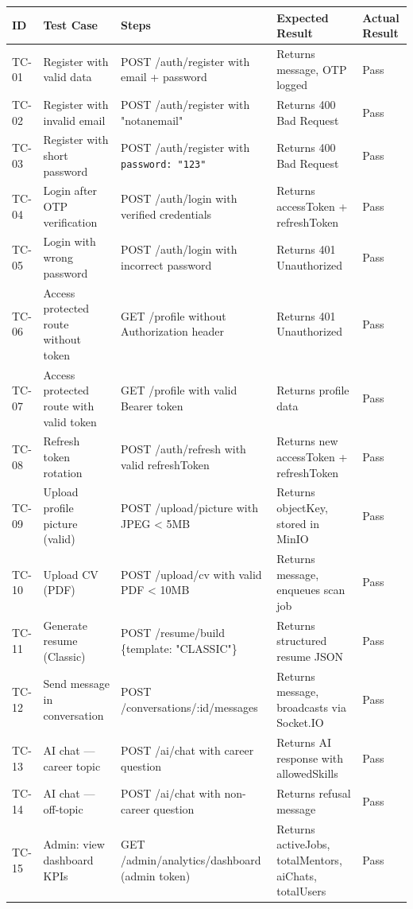 \documentclass[12pt,a4paper]{report}
\begin{document}
\begin{longtable}{|p{0.7cm}|p{3cm}|p{3.5cm}|p{2.5cm}|p{2.5cm}|}
\hline
\textbf{ID} & \textbf{Test Case} & \textbf{Steps} & \textbf{Expected Result} & \textbf{Actual Result} \\
\hline
TC-01 & Register with valid data & POST /auth/register with email + password & Returns message, OTP logged & Pass \\
\hline
TC-02 & Register with invalid email & POST /auth/register with "notanemail" & Returns 400 Bad Request & Pass \\
\hline
TC-03 & Register with short password & POST /auth/register with \texttt{password: "123"} & Returns 400 Bad Request & Pass \\
\hline
TC-04 & Login after OTP verification & POST /auth/login with verified credentials & Returns accessToken + refreshToken & Pass \\
\hline
TC-05 & Login with wrong password & POST /auth/login with incorrect password & Returns 401 Unauthorized & Pass \\
\hline
TC-06 & Access protected route without token & GET /profile without Authorization header & Returns 401 Unauthorized & Pass \\
\hline
TC-07 & Access protected route with valid token & GET /profile with valid Bearer token & Returns profile data & Pass \\
\hline
TC-08 & Refresh token rotation & POST /auth/refresh with valid refreshToken & Returns new accessToken + refreshToken & Pass \\
\hline
TC-09 & Upload profile picture (valid) & POST /upload/picture with JPEG < 5MB & Returns objectKey, stored in MinIO & Pass \\
\hline
TC-10 & Upload CV (PDF) & POST /upload/cv with valid PDF < 10MB & Returns message, enqueues scan job & Pass \\
\hline
TC-11 & Generate resume (Classic) & POST /resume/build \{template: "CLASSIC"\} & Returns structured resume JSON & Pass \\
\hline
TC-12 & Send message in conversation & POST /conversations/:id/messages & Returns message, broadcasts via Socket.IO & Pass \\
\hline
TC-13 & AI chat — career topic & POST /ai/chat with career question & Returns AI response with allowedSkills & Pass \\
\hline
TC-14 & AI chat — off-topic & POST /ai/chat with non-career question & Returns refusal message & Pass \\
\hline
TC-15 & Admin: view dashboard KPIs & GET /admin/analytics/dashboard (admin token) & Returns activeJobs, totalMentors, aiChats, totalUsers & Pass \\

\end{longtable}
\end{document}
